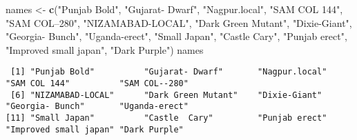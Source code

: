 \documentclass[
]{article}
\newenvironment{Shaded}{\begin{snugshade}}{\end{snugshade}}
\newcommand{\KeywordTok}[1]{\textcolor[rgb]{0.13,0.29,0.53}{\textbf{#1}}}
\newcommand{\NormalTok}[1]{#1}
\newcommand{\StringTok}[1]{\textcolor[rgb]{0.31,0.60,0.02}{#1}}
\begin{document}
\begin{Shaded}
\begin{Highlighting}[]
\NormalTok{names <-}\StringTok{ }\KeywordTok{c}\NormalTok{(}\StringTok{"Punjab Bold"}\NormalTok{, }\StringTok{"Gujarat- Dwarf"}\NormalTok{, }\StringTok{"Nagpur.local"}\NormalTok{, }\StringTok{"SAM COL 144"}\NormalTok{,}
           \StringTok{"SAM COL--280"}\NormalTok{, }\StringTok{"NIZAMABAD-LOCAL"}\NormalTok{, }\StringTok{"Dark Green Mutant"}\NormalTok{,}
           \StringTok{"Dixie-Giant"}\NormalTok{, }\StringTok{"Georgia- Bunch"}\NormalTok{, }\StringTok{"Uganda-erect"}\NormalTok{, }\StringTok{"Small Japan"}\NormalTok{,}
           \StringTok{"Castle  Cary"}\NormalTok{, }\StringTok{"Punjab erect"}\NormalTok{, }\StringTok{"Improved small japan"}\NormalTok{,}
           \StringTok{"Dark Purple"}\NormalTok{)}
\NormalTok{names}
\end{Highlighting}
\end{Shaded}

\begin{verbatim}
 [1] "Punjab Bold"          "Gujarat- Dwarf"       "Nagpur.local"         "SAM COL 144"          "SAM COL--280"        
 [6] "NIZAMABAD-LOCAL"      "Dark Green Mutant"    "Dixie-Giant"          "Georgia- Bunch"       "Uganda-erect"        
[11] "Small Japan"          "Castle  Cary"         "Punjab erect"         "Improved small japan" "Dark Purple"         
\end{verbatim}
\end{document}

